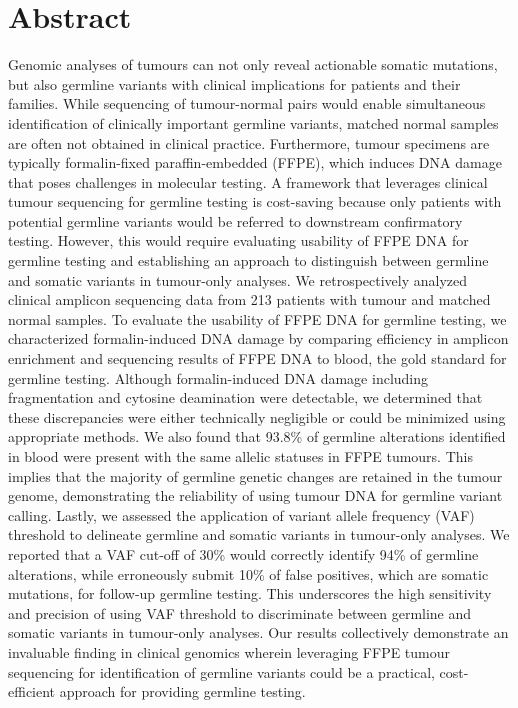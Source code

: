 
\chapter{Abstract}

Genomic analyses of tumours can not only reveal actionable somatic mutations, but also germline variants with clinical implications for patients and their families. While sequencing of tumour-normal pairs would enable simultaneous identification of clinically important germline variants, matched normal samples are often not obtained in clinical practice. Furthermore, tumour specimens are typically formalin-fixed paraffin-embedded (FFPE), which induces DNA damage that poses challenges in molecular testing. A framework that leverages clinical tumour sequencing for germline testing is cost-saving because only patients with potential germline variants would be referred to downstream confirmatory testing. However, this would require evaluating usability of FFPE DNA for germline testing and establishing an approach to distinguish between germline and somatic variants in tumour-only analyses. We retrospectively analyzed clinical amplicon sequencing data from 213 patients with tumour and matched normal samples. To evaluate the usability of FFPE DNA for germline testing, we characterized formalin-induced DNA damage by comparing efficiency in amplicon enrichment and sequencing results of FFPE DNA to blood, the gold standard for germline testing. Although formalin-induced DNA damage including fragmentation and cytosine deamination were detectable, we determined that these discrepancies were either technically negligible or could be minimized using appropriate methods. We also found that 93.8\% of germline alterations identified in blood were present with the same allelic statuses in FFPE tumours. This implies that the majority of germline genetic changes are retained in the tumour genome, demonstrating the reliability of using tumour DNA for germline variant calling. Lastly, we assessed the application of variant allele frequency (VAF) threshold to delineate germline and somatic variants in tumour-only analyses. We reported that a VAF cut-off of 30\% would correctly identify 94\% of germline alterations, while erroneously submit 10\% of false positives, which are somatic mutations, for follow-up germline testing. This underscores the high sensitivity and precision of using VAF threshold to discriminate between germline and somatic variants in tumour-only analyses. Our results collectively demonstrate an invaluable finding in clinical genomics wherein leveraging FFPE tumour sequencing for identification of germline variants could be a practical, cost-efficient approach for providing germline testing. 
